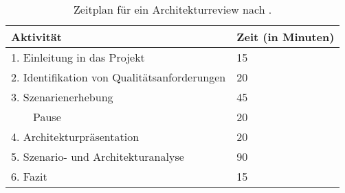 \begin{table}[!h]
  \centering
  \begin{tabular}{l l}
    \toprule
    \textbf{Aktivität} & \textbf{Zeit (in Minuten)} \\ \midrule
    1. Einleitung in das Projekt & 15 \\
    2. Identifikation von Qualitätsanforderungen & 20 \\
    3. Szenarienerhebung & 45 \\
    ~~~~Pause & 20 \\
    4. Architekturpräsentation & 20 \\
    5. Szenario- und Architekturanalyse & 90 \\
    6. Fazit & 15 \\
    \bottomrule
  \end{tabular}
  \caption[Zeitplan für ein Architekturreview nach ]{
    Zeitplan für ein Architekturreview nach .
  }
  \label{tab:svahnberg-plan}
\end{table}
